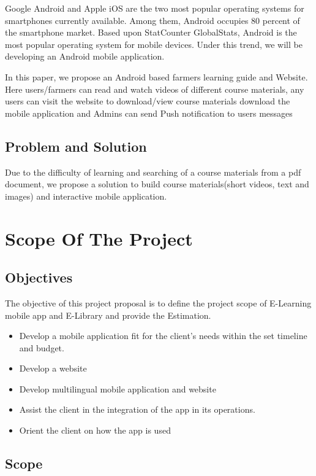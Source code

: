\documentclass[12pt]{extarticle}
\begin{document}
Google Android and Apple iOS are the two most popular
operating systems for smartphones currently available. Among
them, Android occupies 80 percent of the smartphone market.
Based upon StatCounter GlobalStats, Android is the most
popular operating system for mobile devices. Under this trend, we will be developing an Android mobile application.

In this paper, we propose an Android based farmers learning guide
and Website. Here users/farmers can read and watch videos of different course materials, any users can visit the website to download/view course materials download the mobile application and Admins can send Push notification to users messages

\subsection{Problem and Solution}
Due to the difficulty of learning and searching of a course materials from a pdf document, we propose a solution to build course materials(short videos, text and images) and interactive mobile application.


\section{Scope Of The Project}

\subsection{Objectives}
The objective of this project proposal is to define the project scope of E-Learning mobile app and E-Library and provide the Estimation.

\begin{itemize}
	\item Develop a mobile application fit for the client's needs within the set timeline and budget.
	\item Develop a website
	\item Develop multilingual mobile application and website
	\item Assist the client in the integration of the app in its operations.
	\item Orient the client on how the app is used
\end{itemize}

\subsection{Scope}
\end{document}
